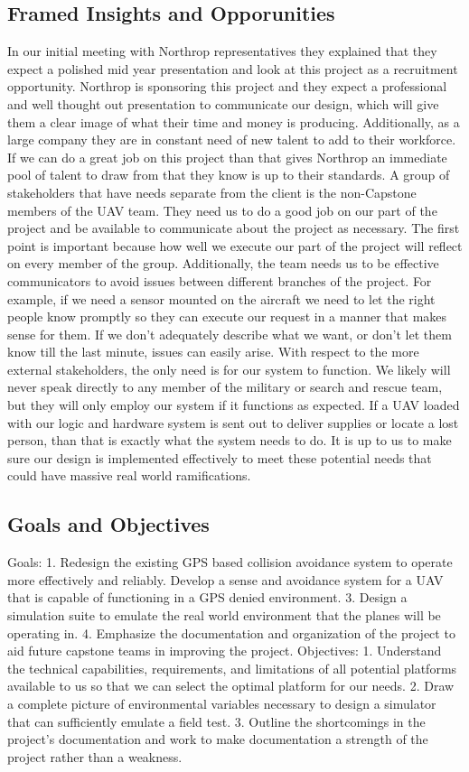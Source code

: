 \documentclass[12pt]{article}
\begin{document}
\subsection{Framed Insights and Opporunities}
	In our initial meeting with Northrop representatives they explained that they expect a polished mid year presentation and look at this project as a recruitment opportunity. Northrop is sponsoring this project and they expect a professional and well thought out presentation to communicate our design, which will give them a clear image of what their time and money is producing. Additionally, as a large company they are in constant need of new talent to add to their workforce. If we can do a great job on this project than that gives Northrop an immediate pool of talent to draw from that they know is up to their standards.
	A group of stakeholders that have needs separate from the client is the non-Capstone members of the UAV team. They need us to do a good job on our part of the project and be available to communicate about the project as necessary. The first point is important because how well we execute our part of the project will reflect on every member of the group. Additionally, the team needs us to be effective communicators to avoid issues between different branches of the project. For example, if we need a sensor mounted on the aircraft we need to let the right people know promptly so they can execute our request in a manner that makes sense for them. If we don’t adequately describe what we want, or don’t let them know till the last minute, issues can easily arise.
	With respect to the more external stakeholders, the only need is for our system to function. We likely will never speak directly to any member of the military or search and rescue team, but they will only employ our system if it functions as expected. If a UAV loaded with our logic and hardware system is sent out to deliver supplies or locate a lost person, than that is exactly what the system needs to do. It is up to us to make sure our design is implemented effectively to meet these potential needs that could have massive real world ramifications.

\subsection{Goals and Objectives}
Goals:
1.    Redesign the existing GPS based collision avoidance system to operate more effectively and reliably.
Develop a sense and avoidance system for a UAV that is capable of functioning in a GPS denied environment.
3.    Design a simulation suite to emulate the real world environment that the planes will be operating in.
4.    Emphasize the documentation and organization of the project to aid future capstone teams in improving the project.
Objectives:
1.    Understand the technical capabilities, requirements, and limitations of all potential platforms available to us so that we can select the optimal platform for our needs.
2.    Draw a complete picture of environmental variables necessary to design a simulator that can sufficiently emulate a field test.
3.    Outline the shortcomings in the project’s documentation and work to make documentation a strength of the project rather than a weakness.
\end{document}
